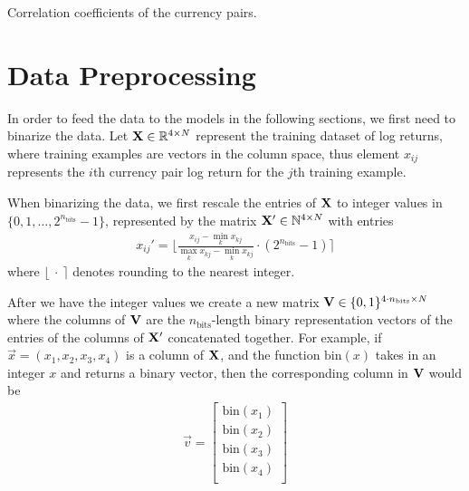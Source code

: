 \begin{table}[!htb]
    \centering
    \begin{adjustbox}{max width=\textwidth}
        
    \end{adjustbox}
    \caption{Correlation coefficients of the currency pairs.}
    \label{tbl:data_correlation_coefficients}
\end{table}


\section{Data Preprocessing}
In order to feed the data to the models in the following sections, we first need to binarize the data.
Let \( \mathbf{X} \in \mathbb{R}^{4 \times N} \) represent the training dataset of log returns, where training examples are vectors in the column space, thus element \( x_{ij} \) represents the \( i \)th currency pair log return for the \( j \)th training example.

When binarizing the data, we first rescale the entries of \( \mathbf{X} \) to integer values in \( \{0, 1, \dots, 2^{n_\text{bits}} - 1\} \), represented by the matrix \( \mathbf{X}' \in \mathbb{N}^{4 \times N} \) with entries
\begin{align}
    x_{ij}' = \bigg\lfloor \frac{x_{ij} - \min_k x_{kj}}{\max_k x_{kj} - \min_k x_{kj}} \cdot (2^{n_\text{bits}} - 1) \bigg\rceil
\end{align}
where \( \lfloor \ \cdot \ \rceil \) denotes rounding to the nearest integer.

After we have the integer values we create a new matrix \( \mathbf{V} \in \{0,1\}^{4\cdot n_\text{bits} \times N} \) where the columns of \( \mathbf{V} \) are the \( n_\text{bits} \)-length binary representation vectors of the entries of the columns of \( \mathbf{X}' \) concatenated together.
For example, if \( \vec{x} = (x_1,x_2,x_3,x_4) \) is a column of \( \mathbf{X} \), and the function \( \text{bin}(x) \) takes in an integer \( x \) and returns a binary vector, then the corresponding column in \( \mathbf{V} \) would be
\begin{align}
    \vec{v} = \begin{bmatrix}
        \text{bin}(x_1) \\
        \text{bin}(x_2) \\
        \text{bin}(x_3) \\
        \text{bin}(x_4) \\
    \end{bmatrix}
\end{align}

